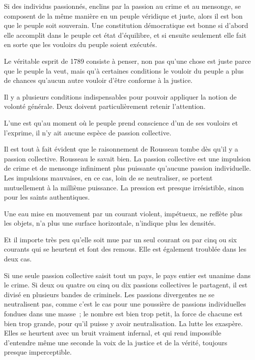 \documentclass[french,twoside]{book} %
\begin{document}
Si des individus passionnés, enclins par la passion au crime et au mensonge, se composent de la même manière en un peuple véridique et juste, alors il est bon que le peuple soit souverain. Une constitution démocratique est bonne si d’abord elle accomplit dans le peuple cet état d’équilibre, et si ensuite seulement elle fait en sorte que les vouloirs du peuple soient exécutés.\par
Le véritable esprit de 1789 consiste à penser, non pas qu’une chose est juste parce que le peuple la veut, mais qu’à certaines conditions le vouloir du peuple a plus de chances qu’aucun autre vouloir d’être conforme à la justice.\par
Il y a plusieurs conditions indispensables pour pouvoir appliquer la notion de volonté générale. Deux doivent particulièrement retenir l’attention.\par
L’une est qu’au moment où le peuple prend conscience d’un de ses vouloirs et l’exprime, il n’y ait aucune espèce de passion collective.\par
Il est tout à fait évident que le raisonnement de Rousseau tombe dès qu’il y a passion collective. Rousseau le savait bien. La passion collective est une impulsion de crime et de mensonge infiniment plus puissante qu’aucune passion individuelle. Les impulsions mauvaises, en ce cas, loin de se neutraliser, se portent mutuellement à la millième puissance. La pression est presque irrésistible, sinon pour les saints authentiques.\par
Une eau mise en mouvement par un courant violent, impétueux, ne reflète plus les objets, n’a plus une surface horizontale, n’indique plus les densités.\par
Et il importe très peu qu’elle soit mue par un seul courant ou par cinq ou six courants qui se heurtent et font des remous. Elle est également troublée dans les deux cas.\par
Si une seule passion collective saisit tout un pays, le pays entier est unanime dans le crime. Si deux ou quatre ou cinq ou dix passions collectives le partagent, il est divisé en plusieurs bandes de criminels. Les passions divergentes ne se neutralisent pas, comme c’est le cas pour une poussière de passions individuelles fondues dans une masse ; le nombre est bien trop petit, la force de chacune est bien trop grande, pour qu’il puisse y avoir neutralisation. La lutte les exaspère. Elles se heurtent avec un bruit vraiment infernal, et qui rend impossible d’entendre même une seconde la voix de la justice et de la vérité, toujours presque imperceptible.\par
\end{document}

